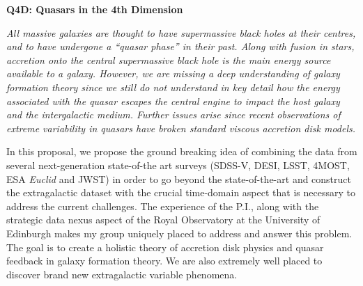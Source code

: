 \documentclass[oneside, a4paper, onecolumn, 11pt]{article}
\begin{document}
\begin{center}
{\Large \bf \textcolor{Cerulean}{Q4D: Quasars in the 4th Dimension\\}}
\end{center}
\vspace{-16pt} 




\medskip \medskip
\noindent
{\it 
All massive galaxies are thought to have supermassive black holes at
their centres, and to have undergone a ``quasar phase'' in
their past. Along with fusion in stars, accretion onto the central
supermassive black hole is the main energy source available to a
galaxy. However, we are missing a deep understanding of galaxy
formation theory since we still do not understand in key detail how
the energy associated with the quasar escapes the central engine to impact the host galaxy and
the intergalactic medium. Further issues arise since recent
observations of extreme variability in quasars have broken standard
viscous accretion disk models.

\smallskip
\smallskip
\noindent
In this proposal, we propose the ground breaking idea of combining the
data from several next-generation state-of-the art surveys (SDSS-V,
DESI, LSST, 4MOST, ESA {\it Euclid} and JWST) in order to go beyond
the state-of-the-art and construct the extragalactic dataset with the
crucial time-domain aspect that is necessary to address the current
challenges.  The experience of the P.I., along with the strategic
data nexus aspect of the Royal Observatory at the University of
Edinburgh makes my group uniquely placed to address and answer this
problem.  The goal is to create a holistic theory of accretion disk
physics and quasar feedback in galaxy formation theory. We are also
extremely well placed to discover brand new extragalactic variable
phenomena.
}
\vspace{-20pt}











\newpage
\fancyhf{}
\setcounter{page}{1}

%


\end{document}
